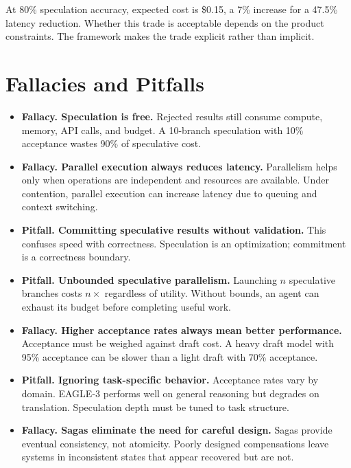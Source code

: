 At 80\% speculation accuracy, expected cost is \$0.15, a 7\% increase for a 47.5\% latency reduction. Whether this trade is acceptable depends on the product constraints. The framework makes the trade explicit rather than implicit.

\section{Fallacies and Pitfalls}

\begin{itemize}
\item \textbf{Fallacy. Speculation is free.}  
Rejected results still consume compute, memory, API calls, and budget. A 10-branch speculation with 10\% acceptance wastes 90\% of speculative cost.

\item \textbf{Fallacy. Parallel execution always reduces latency.}  
Parallelism helps only when operations are independent and resources are available. Under contention, parallel execution can increase latency due to queuing and context switching.

\item \textbf{Pitfall. Committing speculative results without validation.}  
This confuses speed with correctness. Speculation is an optimization; commitment is a correctness boundary.

\item \textbf{Pitfall. Unbounded speculative parallelism.}  
Launching $n$ speculative branches costs $n\times$ regardless of utility. Without bounds, an agent can exhaust its budget before completing useful work.

\item \textbf{Fallacy. Higher acceptance rates always mean better performance.}  
Acceptance must be weighed against draft cost. A heavy draft model with 95\% acceptance can be slower than a light draft with 70\% acceptance.

\item \textbf{Pitfall. Ignoring task-specific behavior.}  
Acceptance rates vary by domain. EAGLE-3 performs well on general reasoning but degrades on translation. Speculation depth must be tuned to task structure.

\item \textbf{Fallacy. Sagas eliminate the need for careful design.}  
Sagas provide eventual consistency, not atomicity. Poorly designed compensations leave systems in inconsistent states that appear recovered but are not.


\end{itemize}
